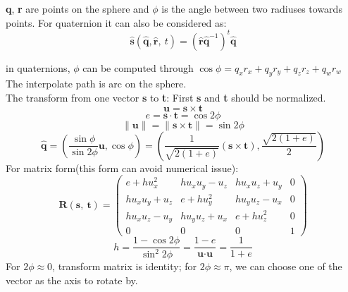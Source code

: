 \documentclass[10pt, a4paper]{article}
\begin{document}
                \textbf{q}, \textbf{r} are points on the sphere and $\phi$ is the angle between two radiuses towards points. For quaternion it can also be considered as: 
                $$\hat{\textbf{s}}(\hat{\textbf{q}}, \hat{\textbf{r}},\ t) = (\hat{\textbf{r}}\hat{\textbf{q}}^{-1})^t\hat{\textbf{q}}$$
                
                in quaternions, $\phi$ can be computed through $\cos{\phi} = q_xr_x + q_yr_y + q_zr_z + q_wr_w$ The interpolate path is arc on the sphere.\\
                
                The transform from one vector \textbf{s} to \textbf{t}: First \textbf{s} and \textbf{t} should be normalized. 
                $$\textbf{u} = \textbf{s} \times \textbf{t}$$
                $$e = \textbf{s} \cdot \textbf{t} = \cos{2\phi}$$
                $$\parallel\textbf{u}\parallel = \parallel\textbf{s}\times\textbf{t}\parallel = \sin{2\phi}$$
                $$\hat{\textbf{q}} = (\frac{\sin{\phi}}{\sin{2\phi}}\textbf{u}, \cos{\phi}) = (\frac{1}{\sqrt{2(1 + e)}}(\textbf{s} \times \textbf{t}), \frac{\sqrt{2(1 + e)}}{2})$$
                \indent For matrix form(this form can avoid numerical issue): 
                \begin{equation*}
                    \textbf{R}(\textbf{s},\ \textbf{t}) = 
                    \begin{pmatrix}
                        e + hu_x^2 & hu_xu_y - u_z & hu_xu_z + u_y & 0 \\
                        hu_xu_y + u_z & e + hu_y^2 & hu_yu_z - u_x & 0 \\
                        hu_xu_z - u_y & hu_yu_z + u_x & e + hu_z^2 & 0 \\
                        0 & 0 & 0 & 1
                    \end{pmatrix}
                \end{equation*}
                $$ h  = \frac{1 - \cos{2\phi}}{\sin^2{2\phi}} = \frac{1 - e}{\textbf{u} \cdot \textbf{u}} = \frac{1}{1 + e}$$
                \indent For $2\phi \approx 0$, transform matrix is identity; for $2\phi \approx \pi$, we can choose one of the vector as the axis to rotate by.
                \newpage 
\end{document}
